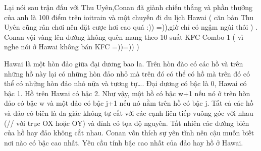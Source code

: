 Lại nói sau trận đấu với Thu Uyên,Conan đã giành chiến thắng và phần thưởng của anh là 100 điểm trên ioitrain và một chuyến đi du lịch Hawai ( căn bản Thu Uyên cũng rân chơi nên đặt cược hơi cao quá :)) =)),giờ chỉ có ngậm ngùi thôi ) . Conan vội vàng lên đường không quên mang theo 10 suất KFC Combo 1 ( vì nghe nói ở Hawai không bán KFC =))=)) )  

   Hawai là một hòn đảo giữa đại dương bao la. Trên hòn đào có các hồ và trên những hồ này lại có những hòn đảo nhỏ mà trên đó có thể có hồ mà trên đó có thể có những hòn đảo nhỏ nữa và tương tự…. Đại dương có bậc là 0, Hawai có bậc 1. Hồ trên Hawai có bậc 2. Như vậy, một hồ có bậc w+1 nếu nó ở trên hòn đảo có bậc w và một đảo có bậc j+1 nếu nó nằm trên hồ có bậc j. Tất cả các hồ và đảo có biên là đa giác không tự cắt với các cạnh liên tiếp vuông góc với nhau (// với trục OX hoặc OY) và đỉnh có tọa độ nguyên. Tất nhiên các đường biên của hồ hay đảo không cắt nhau. Conan vốn thích sự yên tĩnh nên cậu muốn biết nơi nào có bậc cao nhất. Yêu cầu tính bậc cao nhất của đảo hay hồ ở Hawai.  

\